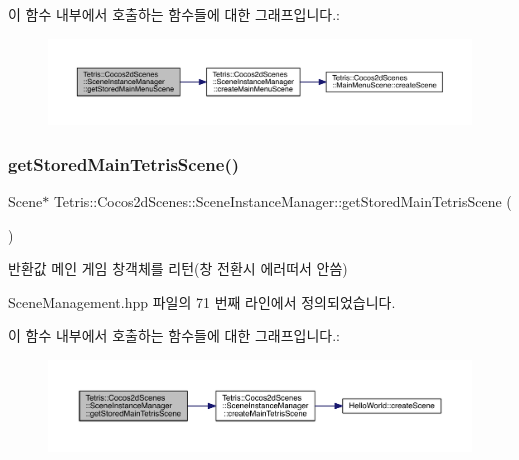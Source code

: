 이 함수 내부에서 호출하는 함수들에 대한 그래프입니다.\+:
\nopagebreak
\begin{figure}[H]
\begin{center}
\leavevmode
\includegraphics[width=350pt]{class_tetris_1_1_cocos2d_scenes_1_1_scene_instance_manager_ac7f573b16a4fd8746fd1f397dbfd01c2_cgraph}
\end{center}
\end{figure}
\mbox{\label{class_tetris_1_1_cocos2d_scenes_1_1_scene_instance_manager_af79d0ad920411ed2b87545b49bc32e6c}} 
\subsubsection{\texorpdfstring{get\+Stored\+Main\+Tetris\+Scene()}{getStoredMainTetrisScene()}}
{\footnotesize\ttfamily Scene$\ast$ Tetris\+::\+Cocos2d\+Scenes\+::\+Scene\+Instance\+Manager\+::get\+Stored\+Main\+Tetris\+Scene (\begin{DoxyParamCaption}{ }\end{DoxyParamCaption})\hspace{0.3cm}{\ttfamily [inline]}}

\begin{DoxyReturn}{반환값}
메인 게임 창객체를 리턴(창 전환시 에러떠서 안씀) 
\end{DoxyReturn}


Scene\+Management.\+hpp 파일의 71 번째 라인에서 정의되었습니다.

이 함수 내부에서 호출하는 함수들에 대한 그래프입니다.\+:
\nopagebreak
\begin{figure}[H]
\begin{center}
\leavevmode
\includegraphics[width=350pt]{class_tetris_1_1_cocos2d_scenes_1_1_scene_instance_manager_af79d0ad920411ed2b87545b49bc32e6c_cgraph}
\end{center}
\end{figure}


